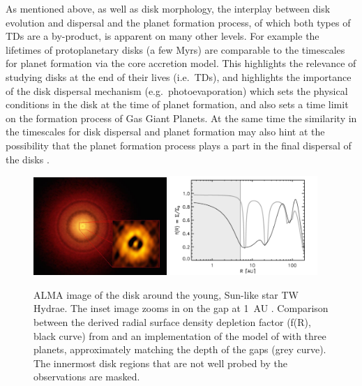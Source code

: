 \documentclass[10pt,fleqn,twoside,a4paper]{article}
\begin{document}
As mentioned above, as well as disk morphology, the interplay between disk evolution and
dispersal and the planet formation process, of which both types of TDs
are a
by-product, is apparent on many other
 levels. For example the lifetimes of protoplanetary disks (a few
Myrs) are comparable to the timescales for planet formation via the core
accretion model. This highlights the relevance of studying disks at the end
of their lives (i.e.\ TDs), and highlights the importance
of the disk dispersal mechanism (e.g.\ photoevaporation) which sets the
physical conditions in the disk at the time of planet formation, and
also sets a time limit on the formation process of Gas Giant Planets. 
At the same time the similarity in the timescales for disk dispersal
and planet formation may also hint at the possibility that the planet
formation process plays a part in the final dispersal of the disks
\citep[e.g.][]{2013MNRAS.430.1392R, 2015MNRAS.454.2173R}.


\begin{figure}
\centerline{\includegraphics[width=0.45\textwidth]{figures/twhya.jpg}
\includegraphics[width=0.5\textwidth]{figures/vanboekel.pdf}}
\caption{ ALMA image of the disk around the young,
  Sun-like star TW Hydrae. The inset image zooms in on
  the gap at 1~AU .  Comparison between the derived radial surface density
depletion factor (f(R), black curve) from \citet{2016arXiv161008939V} and an implementation
of the model of \citet{2015ApJ...807L..11D} with three planets, approximately
matching the depth of the gaps (grey curve). The innermost disk
regions that are not well probed by the observations are masked. } 
\label{fig:twhya}
\end{figure}
\end{document}
